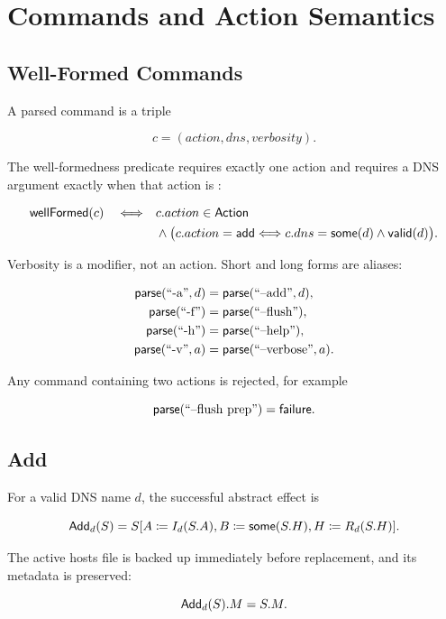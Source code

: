 \section{Commands and Action Semantics}

\subsection{Well-Formed Commands}

A parsed command is a triple

\[
  c=(action,dns,verbosity).
\]

The well-formedness predicate requires exactly one action and requires a DNS
argument exactly when that action is :

\[
\begin{split}
\mathsf{wellFormed}(c)\quad\Longleftrightarrow\quad
  &c.action\in\mathsf{Action}\\
  &{}\land\bigl(c.action=\mathsf{add}
    \Longleftrightarrow c.dns=\mathsf{some}(d)\land\mathsf{valid}(d)\bigr).
\end{split}
\]

Verbosity is a modifier, not an action.  Short and long forms are aliases:

\begin{align*}
\mathsf{parse}(\text{``-a''},d) &= \mathsf{parse}(\text{``--add''},d),\\
\mathsf{parse}(\text{``-f''}) &= \mathsf{parse}(\text{``--flush''}),\\
\mathsf{parse}(\text{``-h''}) &= \mathsf{parse}(\text{``--help''}),\\
\mathsf{parse}(\text{``-v''},a) &= \mathsf{parse}(\text{``--verbose''},a).
\end{align*}

Any command containing two actions is rejected, for example

\[
  \mathsf{parse}(\text{``--flush prep''})=\mathsf{failure}.
\]

\subsection{Add}

For a valid DNS name $d$, the successful abstract effect is

\[
\mathsf{Add}_{d}(S)=S[
  A\coloneqq I_{d}(S.A),
  B\coloneqq\mathsf{some}(S.H),
  H\coloneqq R_{d}(S.H)].
\]

The active hosts file is backed up immediately before replacement, and its
metadata is preserved:

\[
  \mathsf{Add}_{d}(S).M=S.M.
\]


